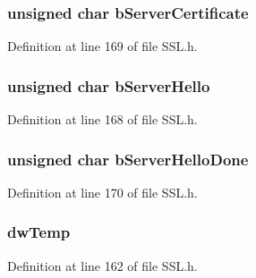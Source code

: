 \subsubsection[{b\+Server\+Certificate}]{\setlength{\rightskip}{0pt plus 5cm}unsigned char b\+Server\+Certificate}\label{struct_s_s_l___s_t_u_b_a181be6449c8a5b1b6e8b01c5b10d7fa0}


Definition at line 169 of file S\+S\+L.\+h.

\hypertarget{struct_s_s_l___s_t_u_b_a6a5cc15fe67f4929e90933e741db9ede}{}
\subsubsection[{b\+Server\+Hello}]{\setlength{\rightskip}{0pt plus 5cm}unsigned char b\+Server\+Hello}\label{struct_s_s_l___s_t_u_b_a6a5cc15fe67f4929e90933e741db9ede}


Definition at line 168 of file S\+S\+L.\+h.

\hypertarget{struct_s_s_l___s_t_u_b_a1d4226fa35675b5087650af562bf14cc}{}
\subsubsection[{b\+Server\+Hello\+Done}]{\setlength{\rightskip}{0pt plus 5cm}unsigned char b\+Server\+Hello\+Done}\label{struct_s_s_l___s_t_u_b_a1d4226fa35675b5087650af562bf14cc}


Definition at line 170 of file S\+S\+L.\+h.

\hypertarget{struct_s_s_l___s_t_u_b_ac634f8e7d951b2462bb247b539cba733}{}
\subsubsection[{dw\+Temp}]{ dw\+Temp}\label{struct_s_s_l___s_t_u_b_ac634f8e7d951b2462bb247b539cba733}


Definition at line 162 of file S\+S\+L.\+h.

